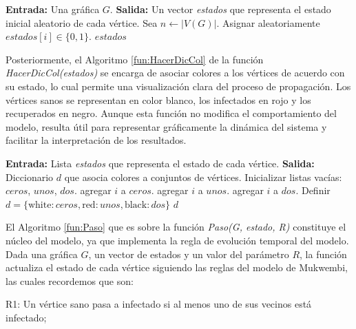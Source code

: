 \documentclass[12pt,titlepage,twoside,openright]{book}
\begin{document}
\begin{algorithm}[h]
\caption{EstadoInicial($G$)}
\label{fun:EstadoInicial}
\begin{algorithmic}[1]
\State \textbf{Entrada:} Una gr\'afica $G$.
\State \textbf{Salida:} Un vector \textit{estados} que representa el estado inicial aleatorio de cada v\'ertice.
\State Sea $n \gets |V(G)|$.
    \State Asignar aleatoriamente $estados[i] \in \{0,1\}$.
\EndFor
\State \Return $estados$
\end{algorithmic}
\end{algorithm}
\newpage
Posteriormente, el Algoritmo \ref{fun:HacerDicCol} de la funci\'on \textit{HacerDicCol(estados)} se encarga de asociar colores a los v\'ertices de acuerdo con su estado, lo cual permite una visualizaci\'on clara del proceso de propagaci\'on. Los v\'ertices sanos se representan en color blanco, los infectados en rojo y los recuperados en negro. Aunque esta funci\'on no modifica el comportamiento del modelo, resulta \'util para representar gr\'aficamente la din\'amica del sistema y facilitar la interpretaci\'on de los resultados.
\begin{algorithm}[h!]
\caption{HacerDicCol(\textit{estados})}
\label{fun:HacerDicCol}
\begin{algorithmic}[1]
\State \textbf{Entrada:} Lista \textit{estados} que representa el estado de cada v\'ertice.
\State \textbf{Salida:} Diccionario $d$ que asocia colores a conjuntos de v\'ertices.
\State Inicializar listas vac\'ias: $ceros$, $unos$, $dos$.
     agregar $i$ a $ceros$.
     agregar $i$ a $unos$.
     agregar $i$ a $dos$.
    \EndIf
\EndFor
\State Definir $d = \{\text{white}: ceros, \text{red}: unos, \text{black}: dos\}$
\State \Return $d$
\end{algorithmic}
\end{algorithm}

El Algoritmo \ref{fun:Paso} que es sobre la funci\'on \textit{Paso(G, estado, R)} constituye el n\'ucleo del modelo, ya que implementa la regla de evoluci\'on temporal del modelo. Dada una gr\'afica $G$, un vector de estados y un valor del par\'ametro $R$, la funci\'on actualiza el estado de cada v\'ertice siguiendo las reglas del modelo de Mukwembi, las cuales recordemos que son:

R1: Un v\'ertice sano pasa a infectado si al menos uno de sus vecinos est\'a infectado;
\end{document}
